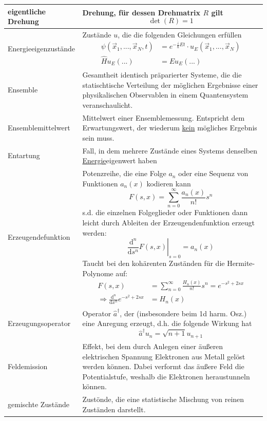 \documentclass{article}
\newcommand{\diff}{\mathrm{d}}
\begin{document}
\begin{xltabular}{\linewidth}{l|X}
	\hline
		eigentliche Drehung & Drehung, für dessen Drehmatrix $R$ gilt
			$$\det(R) = 1$$ \\
	\hline
		Energieeigenzustände & Zustände $u$, die die folgenden Gleichungen erfüllen
			{\begin{align*}
				\psi(\vec{x}_1,...,\vec{x}_N,t) &= e^{-\frac{i}{\hbar}Et} \cdot u_E(\vec{x}_1,...,\vec{x}_N) \\
				\hat{H}u_E(...) &= E u_E(...)
			\end{align*}} \\
	\hline
		Ensemble & Gesamtheit identisch präparierter Systeme, die die statischtische Verteilung der möglichen Ergebnisse einer physikalischen Observablen in einem Quantensystem veranschaulicht.\\
	\hline
		Ensemblemittelwert & Mittelwert einer Ensemblemessung. Entspricht dem Erwartungswert, der wiederum \underline{kein} mögliches Ergebnis sein muss.\\
	\hline
		Entartung & Fall, in dem mehrere Zustände eines Systems denselben \underline{Energie}eigenwert haben\\
	\hline
		Erzeugendefunktion & Potenzreihe, die eine Folge $a_n$ oder eine Sequenz von Funktionen $a_n(x)$ kodieren kann
			$$F(s,x) = \sum_{n=0}^\infty \frac{a_n(x)}{n!} s^n$$
		s.d. die einzelnen Folgeglieder oder Funktionen dann leicht durch Ableiten der Erzeugendenfunktion erzeugt werden:
			$$\left.\frac{\diff^n}{\diff s^n} F(s,x)\right|_{s=0} = a_n(x)$$
		\textcolor{gruen}{Taucht bei den kohärenten Zuständen für die Hermite-Polynome auf:
			{\begin{align*}
				F(s,x) &= \sum_{n=0}^\infty \frac{H_n(x)}{n!} s^n = e^{-s^2 + 2sx}\\
				\Rightarrow \frac{\diff^n}{\diff x^n} e^{-s^2 + 2sx} &= H_n(x)
			\end{align*}}}\\
	\hline
		Erzeugungsoperator & Operator $\hat{a}^\dagger$, der (insbesondere beim 1d harm. Osz.) eine Anregung erzeugt, d.h. die folgende Wirkung hat
			$$\hat{a}^\dagger u_n = \sqrt{n + 1} u_{n+1}$$ \\
	\hline
		Feldemission & Effekt, bei dem durch Anlegen einer äußeren elektrischen Spannung Elektronen aus Metall gelöst werden können. Dabei verformt das äußere Feld die Potentialstufe, weshalb die Elektronen heraustunneln können.\\
	\hline
		gemischte Zustände & Zustönde, die eine statistische Mischung von reinen Zuständen darstellt. \\
	\hline

\end{xltabular}
\end{document}
